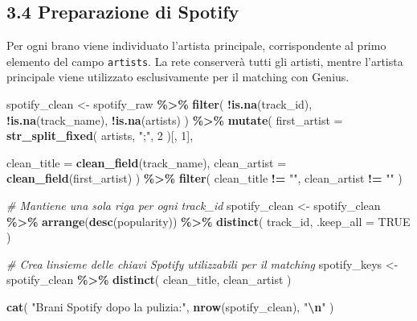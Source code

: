 \documentclass[
]{article}
\newenvironment{Shaded}{\begin{snugshade}}{\end{snugshade}}
\newcommand{\AttributeTok}[1]{\textcolor[rgb]{0.13,0.29,0.53}{#1}}
\newcommand{\CommentTok}[1]{\textcolor[rgb]{0.56,0.35,0.01}{\textit{#1}}}
\newcommand{\ConstantTok}[1]{\textcolor[rgb]{0.56,0.35,0.01}{#1}}
\newcommand{\DecValTok}[1]{\textcolor[rgb]{0.00,0.00,0.81}{#1}}
\newcommand{\FunctionTok}[1]{\textcolor[rgb]{0.13,0.29,0.53}{\textbf{#1}}}
\newcommand{\NormalTok}[1]{#1}
\newcommand{\OtherTok}[1]{\textcolor[rgb]{0.56,0.35,0.01}{#1}}
\newcommand{\SpecialCharTok}[1]{\textcolor[rgb]{0.81,0.36,0.00}{\textbf{#1}}}
\newcommand{\StringTok}[1]{\textcolor[rgb]{0.31,0.60,0.02}{#1}}
\begin{document}
\subsection{3.4 Preparazione di Spotify}\label{preparazione-di-spotify}

Per ogni brano viene individuato l'artista principale, corrispondente al
primo elemento del campo \texttt{artists}. La rete conserverà tutti gli
artisti, mentre l'artista principale viene utilizzato esclusivamente per
il matching con Genius.

\begin{Shaded}
\begin{Highlighting}[]
\NormalTok{spotify\_clean }\OtherTok{\textless{}{-}}\NormalTok{ spotify\_raw }\SpecialCharTok{\%\textgreater{}\%}
  \FunctionTok{filter}\NormalTok{(}
    \SpecialCharTok{!}\FunctionTok{is.na}\NormalTok{(track\_id),}
    \SpecialCharTok{!}\FunctionTok{is.na}\NormalTok{(track\_name),}
    \SpecialCharTok{!}\FunctionTok{is.na}\NormalTok{(artists)}
\NormalTok{  ) }\SpecialCharTok{\%\textgreater{}\%}
  \FunctionTok{mutate}\NormalTok{(}
    \AttributeTok{first\_artist =} \FunctionTok{str\_split\_fixed}\NormalTok{(}
\NormalTok{      artists,}
      \StringTok{";"}\NormalTok{,}
      \DecValTok{2}
\NormalTok{    )[, }\DecValTok{1}\NormalTok{],}

    \AttributeTok{clean\_title =} \FunctionTok{clean\_field}\NormalTok{(track\_name),}
    \AttributeTok{clean\_artist =} \FunctionTok{clean\_field}\NormalTok{(first\_artist)}
\NormalTok{  ) }\SpecialCharTok{\%\textgreater{}\%}
  \FunctionTok{filter}\NormalTok{(}
\NormalTok{    clean\_title }\SpecialCharTok{!=} \StringTok{""}\NormalTok{,}
\NormalTok{    clean\_artist }\SpecialCharTok{!=} \StringTok{""}
\NormalTok{  )}

\CommentTok{\# Mantiene una sola riga per ogni track\_id}
\NormalTok{spotify\_clean }\OtherTok{\textless{}{-}}\NormalTok{ spotify\_clean }\SpecialCharTok{\%\textgreater{}\%}
  \FunctionTok{arrange}\NormalTok{(}\FunctionTok{desc}\NormalTok{(popularity)) }\SpecialCharTok{\%\textgreater{}\%}
  \FunctionTok{distinct}\NormalTok{(}
\NormalTok{    track\_id,}
    \AttributeTok{.keep\_all =} \ConstantTok{TRUE}
\NormalTok{  )}

\CommentTok{\# Crea l\textquotesingle{}insieme delle chiavi Spotify utilizzabili per il matching}
\NormalTok{spotify\_keys }\OtherTok{\textless{}{-}}\NormalTok{ spotify\_clean }\SpecialCharTok{\%\textgreater{}\%}
  \FunctionTok{distinct}\NormalTok{(}
\NormalTok{    clean\_title,}
\NormalTok{    clean\_artist}
\NormalTok{  )}

\FunctionTok{cat}\NormalTok{(}
  \StringTok{"Brani Spotify dopo la pulizia:"}\NormalTok{,}
  \FunctionTok{nrow}\NormalTok{(spotify\_clean),}
  \StringTok{"}\SpecialCharTok{\textbackslash{}n}\StringTok{"}
\NormalTok{)}
\end{Highlighting}
\end{Shaded}
\end{document}
